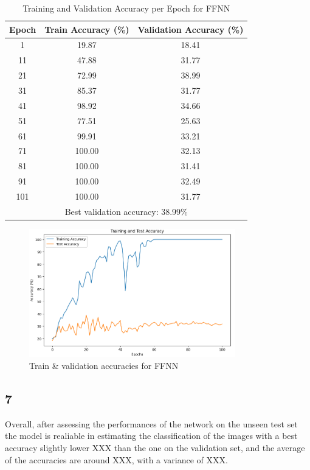 \documentclass[11pt]{scrartcl}
\begin{document}
\begin{table}[htbp]
\centering
\caption{Training and Validation Accuracy per Epoch for FFNN}
\begin{tabular}{ccc}
\toprule
\textbf{Epoch} & \textbf{Train Accuracy (\%)} & \textbf{Validation Accuracy (\%)} \\
\midrule
1    & 19.87  & 18.41  \\
11   & 47.88  & 31.77  \\
21   & 72.99  & 38.99  \\
31   & 85.37  & 31.77  \\
41   & 98.92  & 34.66  \\
51   & 77.51  & 25.63  \\
61   & 99.91  & 33.21  \\
71   & 100.00 & 32.13  \\
81   & 100.00 & 31.41  \\
91   & 100.00 & 32.49  \\
101  & 100.00 & 31.77  \\
\midrule
\multicolumn{3}{c}{Best validation accuracy: 38.99\%} \\
\bottomrule
\end{tabular}
\label{tab:task1-accuracy}
\end{table}

\begin{figure}[htbp]
\centering
\includegraphics[width=0.8\textwidth]{./figures/task1-accuracy.png}
\caption{Train \& validation accuracies for FFNN}
\label{fig:task1-accuracy}
\end{figure}

\subsection*{7}

Overall, after assessing the performances of the network on the unseen test set
the model is realiable in estimating the classification of the images with
a best accuracy slightly lower XXX than the one on the validation set,
and the average of the accuracies are around XXX,
with a variance of XXX.
\end{document}
